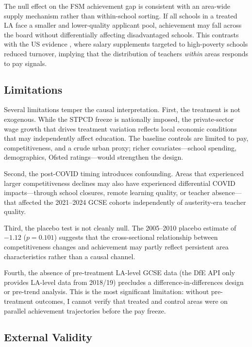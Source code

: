 \documentclass[12pt]{article}
\begin{document}
The null effect on the FSM achievement gap is consistent with an area-wide supply mechanism rather than within-school sorting. If all schools in a treated LA face a smaller and lower-quality applicant pool, achievement may fall across the board without differentially affecting disadvantaged schools. This contrasts with the US evidence \citep{clotfelter2008would}, where salary supplements targeted to high-poverty schools reduced turnover, implying that the distribution of teachers \textit{within} areas responds to pay signals.

\subsection{Limitations}

Several limitations temper the causal interpretation. First, the treatment is not exogenous. While the STPCD freeze is nationally imposed, the private-sector wage growth that drives treatment variation reflects local economic conditions that may independently affect education. The baseline controls are limited to pay, competitiveness, and a crude urban proxy; richer covariates---school spending, demographics, Ofsted ratings---would strengthen the design.

Second, the post-COVID timing introduces confounding. Areas that experienced larger competitiveness declines may also have experienced differential COVID impacts---through school closures, remote learning quality, or teacher absence---that affected the 2021--2024 GCSE cohorts independently of austerity-era teacher quality.

Third, the placebo test is not cleanly null. The 2005--2010 placebo estimate of $-1.12$ ($p = 0.101$) suggests that the cross-sectional relationship between competitiveness changes and achievement may partly reflect persistent area characteristics rather than a causal channel.

Fourth, the absence of pre-treatment LA-level GCSE data (the DfE API only provides LA-level data from 2018/19) precludes a difference-in-differences design or pre-trend analysis. This is the most significant limitation: without pre-treatment outcomes, I cannot verify that treated and control areas were on parallel achievement trajectories before the pay freeze.

\subsection{External Validity}
\end{document}
